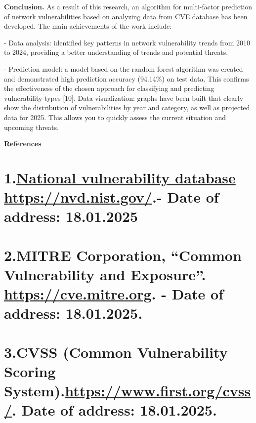 {\bfseries Conclusion.} As a result of this research, an algorithm for
multi-factor prediction of network vulnerabilities based on analyzing
data from CVE database has been developed. The main achievements of the
work include:


- Data analysis: identified key patterns in network vulnerability trends
from 2010 to 2024, providing a better understanding of trends and
potential threats.

- Prediction model: a model based on the random forest algorithm was
created and demonstrated high prediction accuracy (94.14\%) on test
data. This confirms the effectiveness of the chosen approach for
classifying and predicting vulnerability types {[}10{]}.
Data visualization: graphs have been built that clearly show the
distribution of vulnerabilities by year and category, as well as
projected data for 2025. This allows you to quickly assess the current
situation and upcoming threats.

{\bfseries References}

\section{\texorpdfstring{1.\href{https://nvd.nist.gov/}{National
vulnerability database} \url{https://nvd.nist.gov/}.- Date of address:
18.01.2025}{1.National vulnerability database https://nvd.nist.gov/.- Date of address: 18.01.2025}}\label{national-vulnerability-database-httpsnvd.nist.gov.--date-of-address-18.01.2025}

\section{\texorpdfstring{2.MITRE Corporation, ``Common Vulnerability and
Exposure''. \url{https://cve.mitre.org}. - Date of address:
18.01.2025. }{2.MITRE Corporation, ``Common Vulnerability and Exposure''. https://cve.mitre.org. - Date of address: 18.01.2025.}}\label{mitre-corporation-common-vulnerability-and-exposure.-httpscve.mitre.org.---date-of-address-18.01.2025.}

\section{\texorpdfstring{3.CVSS (Common Vulnerability Scoring
System).\url{https://www.first.org/cvss/}. Date of address:
18.01.2025. }{3.CVSS (Common Vulnerability Scoring System).https://www.first.org/cvss/. Date of address: 18.01.2025.}}\label{cvss-common-vulnerability-scoring-system.httpswww.first.orgcvss.-date-of-address-18.01.2025.}

